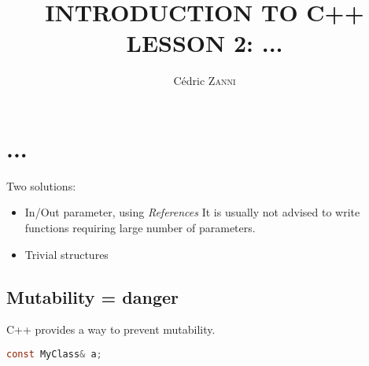 \documentclass[11pt]{article}
\begin{document}
    \title{\small INTRODUCTION TO C++ \\ \LARGE LESSON 2: ...}
    \author{Cédric \textsc{Zanni}}

    \maketitle

    \section{...}
    Two solutions:
    \begin{itemize}
        \item In/Out parameter, using \textit{References}
It is usually not advised to write functions requiring large number of parameters.
        \item Trivial structures

    \end{itemize}

    \subsection*{Mutability = danger}
    C++ provides a way to prevent mutability.
    \begin{lstlisting}[language=C]
const MyClass& a;
    \end{lstlisting}
\end{document}
